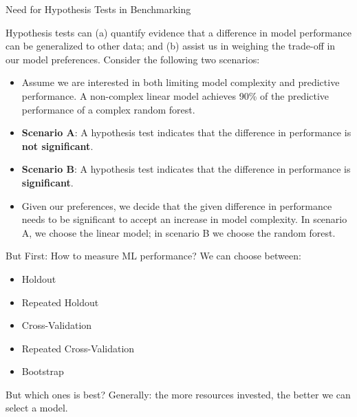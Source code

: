 \documentclass[11pt,compress,t,notes=noshow, xcolor=table]{beamer}
\begin{document}
\begin{frame}{Need for Hypothesis Tests in Benchmarking}

Hypothesis tests can (a) quantify evidence that a difference in model performance can be generalized to other data; and (b) assist us in weighing the trade-off in our model preferences. Consider the following two scenarios:
\vspace{0.25cm}
\begin{itemize}
    \setlength\itemsep{1em}
    \item Assume we are interested in both limiting model complexity and predictive performance. A non-complex linear model achieves 90\% of the predictive performance of a complex random forest.
    \item \textbf{Scenario A}: A hypothesis test indicates that the difference in performance is \textbf{not significant}.
    \item \textbf{Scenario B}: A hypothesis test indicates that the difference in performance is \textbf{significant}.
    \item Given our preferences, we decide that the given difference in performance needs to be significant to accept an increase in model complexity. In scenario A, we choose the linear model; in scenario B we choose the random forest.
\end{itemize}

\end{frame}

\begin{frame}{But First: How to measure ML performance?}
\vfill
We can choose between:
\vfill
\begin{itemize}
    \item Holdout
    \item Repeated Holdout
    \item Cross-Validation
    \item Repeated Cross-Validation
    \item Bootstrap
\end{itemize}
\vfill
But which ones is best?
\pause
\newline{}
Generally: the more resources invested, the better we can select a model.
\end{frame}
\end{document}
